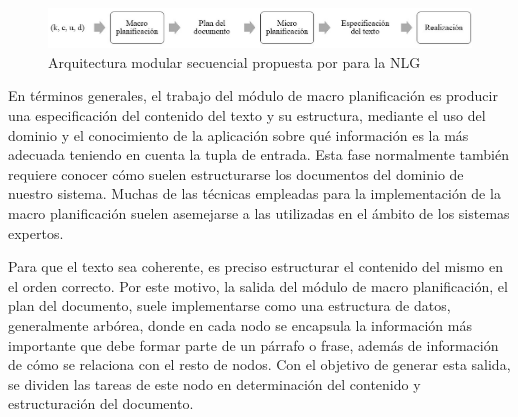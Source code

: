 \begin{figure}[h]
	\centering%
	\centerline{\includegraphics[width = \textwidth]{Imagenes/Bitmap/pipeline-nlg.jpg}}%
	\caption{Arquitectura modular secuencial propuesta por \cite{biblia} para la NLG}%
	\label{fig:pipelinenlg}
\end{figure}

En términos generales, el trabajo del módulo de macro planificación es producir una especificación del contenido del texto y su estructura, mediante el uso del dominio y el conocimiento de la aplicación sobre qué información es la más adecuada teniendo en cuenta la tupla de entrada. Esta fase normalmente también requiere conocer cómo suelen estructurarse los documentos del dominio de nuestro sistema. Muchas de las técnicas empleadas para la implementación de la macro planificación suelen asemejarse a las utilizadas en el ámbito de los sistemas expertos.

Para que el texto sea coherente, es preciso estructurar el contenido del mismo en el orden correcto. Por este motivo, la salida del módulo de macro planificación, el plan del documento, suele implementarse como una estructura de datos, generalmente arbórea, donde en cada nodo se encapsula la información más importante que debe formar parte de un párrafo o frase, además de información de cómo se relaciona con el resto de nodos. Con el objetivo de generar esta salida, se dividen las tareas de este nodo en determinación del contenido y estructuración del documento.

